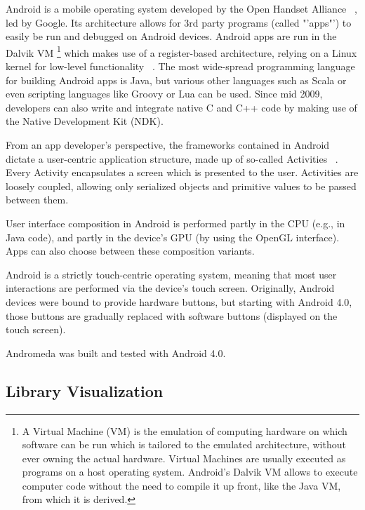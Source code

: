 Android is a mobile operating system developed by the Open Handset Alliance ~\cite{url:openhandsetalliance}, led by Google. Its architecture allows for 3rd party programs (called "'apps"') to easily be run and debugged on Android devices.
Android apps are run in the Dalvik VM \footnote{A Virtual Machine (VM) is the emulation of computing hardware on which software can be run which is tailored to the emulated architecture, without ever owning the actual hardware. Virtual Machines are usually executed as programs on a host operating system. Android's Dalvik VM allows to execute computer code without the need to compile it up front, like the Java VM, from which it is derived.} which makes use of a register-based architecture, relying on a Linux kernel for low-level functionality ~\cite{dalvik}. The most wide-spread programming language for building Android apps is Java, but various other languages such as Scala or even scripting languages like Groovy or Lua can be used. Since mid 2009, developers can also write and integrate native C and C++ code by making use of the Native Development Kit (NDK).

From an app developer's perspective, the frameworks contained in Android dictate a user-centric application structure, made up of so-called Activities ~\cite{url:androidactivity}. Every Activity encapsulates a screen which is presented to the user. Activities are loosely coupled, allowing only serialized objects and primitive values to be passed between them.

User interface composition in Android is performed partly in the CPU (e.g., in Java code), and partly in the device's GPU (by using the OpenGL interface). Apps can also choose between these composition variants.

Android is a strictly touch-centric operating system, meaning that most user interactions are performed via the device's touch screen. Originally, Android devices were bound to provide hardware buttons, but starting with Android 4.0, those buttons are gradually replaced with software buttons (displayed on the touch screen).

Andromeda was built and tested with Android 4.0.

\subsection{Library Visualization}
\label{subsec:libraryvis}

